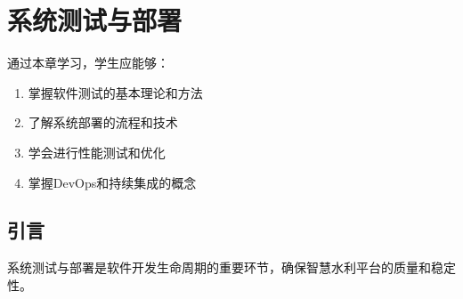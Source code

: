 \chapter{系统测试与部署}

\begin{learningobjectives}
通过本章学习，学生应能够：
\begin{enumerate}
    \item 掌握软件测试的基本理论和方法
    \item 了解系统部署的流程和技术
    \item 学会进行性能测试和优化
    \item 掌握DevOps和持续集成的概念
\end{enumerate}
\end{learningobjectives}

\section{引言}

系统测试与部署是软件开发生命周期的重要环节，确保智慧水利平台的质量和稳定性。

